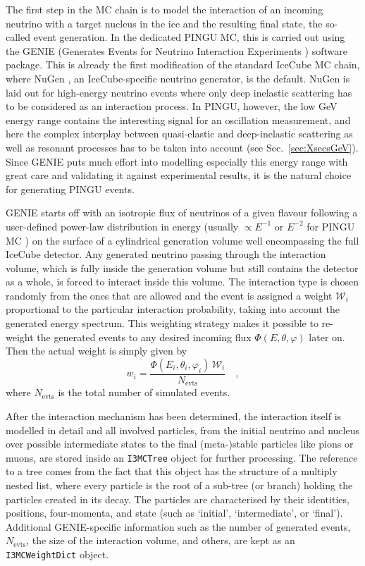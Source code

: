 The first step in the MC chain is to model the interaction of an incoming
neutrino with a target nucleus in the ice and the resulting final state, the
so-called
event generation. In the dedicated PINGU MC, this is carried out using the
GENIE (Generates Events for Neutrino Interaction Experiments \cite{GENIE})
software package. This is already the first modification of the standard
IceCube MC chain, where NuGen \cite{NuGen}, an IceCube-specific neutrino
generator, is the default. NuGen is laid out for high-energy neutrino
events where only deep inelastic scattering has to be considered as an
interaction process. In PINGU, however, the low GeV energy range contains the
interesting signal for an oscillation measurement, and here the complex
interplay between
quasi-elastic and deep-inelastic scattering as well as resonant processes has
to be taken into account (see Sec.~\ref{sec:XsecsGeV}). Since GENIE puts much
effort into modelling especially this energy range with great care and
validating it against experimental results, it is the natural choice for
generating PINGU events.

GENIE starts off with an isotropic flux of neutrinos of a given flavour
following a user-defined power-law distribution in energy (usually $\propto
E^{-1}$ or $E^{-2}$ for PINGU MC \cite{PINGU_MC}) on the surface of a
cylindrical generation volume well encompassing the full IceCube detector. Any
generated neutrino passing through the interaction volume, which is fully inside
the generation volume but still contains the detector as a whole, is forced to
interact inside this volume. The interaction type is chosen randomly from the
ones that are allowed and the event is assigned a weight $\mathcal{W}_i$
proportional to the particular interaction probability, taking into account the
generated energy spectrum. This weighting strategy makes it possible to
re-weight the generated events to any desired incoming flux $\Phi(E, \theta,
\varphi)$ later on. Then the actual weight is simply given by
\begin{equation}
 w_i = \frac{\Phi(E_i, \theta_i, \varphi_i)\,\mathcal{W}_i}{N_\mathrm{evts}}
  \quad, \label{eqn:reweight}
\end{equation}
where $N_\mathrm{evts}$ is the total number of simulated events.

After the interaction mechanism has been determined, the interaction itself is
modelled in detail and all involved particles, from the initial neutrino and
nucleus over possible intermediate states to the final (meta-)stable particles
like pions or muons, are stored inside an \texttt{I3MCTree} object for further
processing. The reference to a tree comes from the fact that this object has
the structure of a multiply nested list, where every particle is the root of a
sub-tree (or branch) holding the particles created in its decay. The particles
are characterised by their identities, positions, four-momenta, and state (such
as `initial', `intermediate', or `final').
Additional GENIE-specific information such as the number of generated events,
$N_\mathrm{evts}$, the size of the interaction volume, and others, are kept as
an \texttt{I3MCWeightDict} object.

